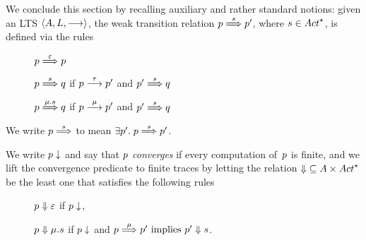 We conclude this section by recalling auxiliary and rather standard
notions: given an LTS $\langle A, L, \mathrel{\overset{}\longrightarrow} \rangle$,
the weak transition relation $\state \wt{ \trace } \stateA $,
where $ \trace \in\Actfin$,
is defined via the rules
\begin{description}
\item[]
  $p \mathrel{\overset{\varepsilon} \Longrightarrow} p$
\item[]
  $p \mathrel{\overset{ s } \Longrightarrow} q$ if $\state\st{\tau}\stateA$
  and $\stateA \wt{ \trace } \stateB$
\item[]
  $p \mathrel{\overset{\mu.s} \Longrightarrow} q$ if $\state \st{\mu} \stateA$
  and $\stateA \wt{\trace} \stateB$
\end{description}
We write $ p \mathrel{\overset{ s } \Longrightarrow}  $ to mean  $\exists \stateA \suchthat \state
\wt{ \trace } \stateA$.



\renewcommand{\stateA}{p'}
We write $p \downarrow$ and say that {\em $p$ converges} if every
computation of~$p$ is finite, and we lift the convergence predicate
to finite traces by letting the relation
${\cnvalong} \subseteq \States \times \Actfin$ be the least one that
satisfies the following rules%
\begin{description}
\item[\cnvepsilon] $p \mathrel{\Downarrow} \varepsilon$ if $p \downarrow$,
\item[\cnvmu] $ p \mathrel{\Downarrow} \mu.s $ if $p \downarrow$ and
  $\state \wt{\mu} \stateA \implies \stateA \cnvalong \trace$.
\end{description}



